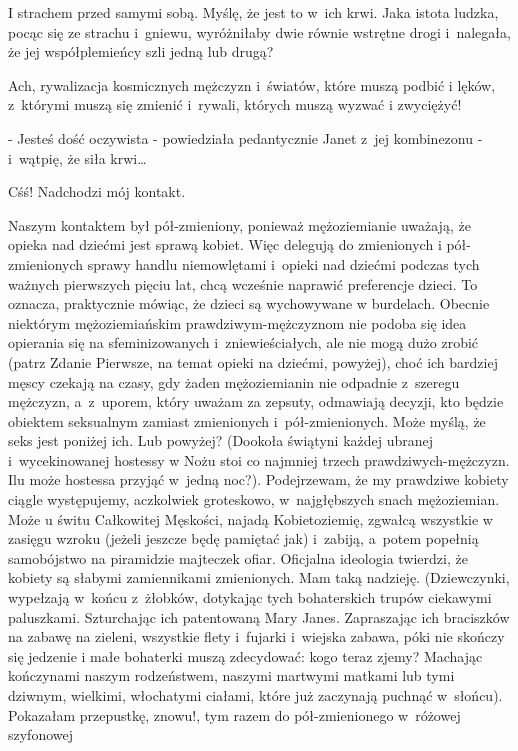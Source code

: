 \documentclass[oneside,polish,12pt,sfheadings]{mwbk}
\begin{document}
I strachem przed samymi sobą. Myślę, że jest to w~ich krwi. Jaka istota
ludzka, pocąc się ze strachu i~gniewu, wyróżniłaby dwie równie wstrętne
drogi i~nalegała, że jej współplemieńcy szli jedną lub drugą?

Ach, rywalizacja kosmicznych mężczyzn i~światów, które muszą podbić
i lęków, z~którymi muszą się zmienić i~rywali, których muszą wyzwać
i zwyciężyć!

- Jesteś dość oczywista - powiedziała pedantycznie Janet z~jej kombinezonu
- i~wątpię, że siła krwi\ldots

Cśś! Nadchodzi mój kontakt.

Naszym kontaktem był pół-zmieniony, ponieważ mężoziemianie uważają,
że opieka nad dziećmi jest sprawą kobiet. Więc delegują do zmienionych
i pół-zmienionych sprawy handlu niemowlętami i~opieki nad dziećmi
podczas tych ważnych pierwszych pięciu lat, chcą wcześnie naprawić
preferencje dzieci. To oznacza, praktycznie mówiąc, że dzieci są wychowywane
w burdelach. Obecnie niektórym mężoziemiańskim prawdziwym-mężczyznom
nie podoba się idea opierania się na sfeminizowanych i~zniewieściałych,
ale nie mogą dużo zrobić (patrz Zdanie Pierwsze, na temat opieki na
dziećmi, powyżej), choć ich bardziej męscy czekają na czasy, gdy żaden
mężoziemianin nie odpadnie z~szeregu mężczyzn, a~z~uporem, który uważam
za zepsuty, odmawiają decyzji, kto będzie obiektem seksualnym zamiast
zmienionych i~pół-zmienionych. Może myślą, że seks jest poniżej ich.
Lub powyżej? (Dookoła świątyni każdej ubranej i~wycekinowanej hostessy
w Nożu stoi co najmniej trzech prawdziwych-mężczyzn. Ilu może hostessa
przyjąć w~jedną noc?). Podejrzewam, że my prawdziwe kobiety ciągle
występujemy, aczkolwiek groteskowo, w~najgłębszych snach mężoziemian.
Może u świtu Całkowitej Męskości, najadą Kobietoziemię, zgwałcą wszystkie
w zasięgu wzroku (jeżeli jeszcze będę pamiętać jak) i~zabiją, a~potem
popełnią samobójstwo na piramidzie majteczek ofiar. Oficjalna ideologia
twierdzi, że kobiety są słabymi zamiennikami zmienionych. Mam taką
nadzieję. (Dziewczynki, wypełzają w~końcu z~żłobków, dotykając tych
bohaterskich trupów ciekawymi paluszkami. Szturchając ich patentowaną
Mary Janes. Zapraszając ich braciszków na zabawę na zieleni, wszystkie
flety i~fujarki i~wiejska zabawa, póki nie skończy się jedzenie i
małe bohaterki muszą zdecydować: kogo teraz zjemy? Machając kończynami
naszym rodzeństwem, naszymi martwymi matkami lub tymi dziwnym, wielkimi,
włochatymi ciałami, które już zaczynają puchnąć w~słońcu). Pokazałam
przepustkę, znowu!, tym razem do pół-zmienionego w~różowej szyfonowej
\end{document}
